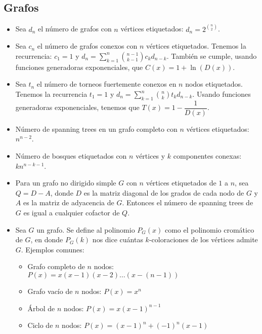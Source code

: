 \documentclass[11pt]{article}
\begin{document}
		\subsection{Grafos}
			\begin{itemize}
				\item Sea $d_n$ el número de grafos con $n$ vértices etiquetados: $\displaystyle d_n = 2^{\binom{n}{2}}$.
				\item Sea $c_n$ el número de grafos conexos con $n$ vértices etiquetados. Tenemos la recurrencia: $c_1=1$ y $\displaystyle d_n = \sum_{k=1}^{n} \binom{n-1}{k-1} c_k d_{n-k}$. También se cumple, usando funciones generadoras exponenciales, que $C(x)=1+\ln(D(x))$.
				\item Sea $t_n$ el número de torneos fuertemente conexos en $n$ nodos etiquetados. Tenemos la recurrencia $t_1=1$ y $\displaystyle d_n = \sum_{k=1}^{n} \binom{n}{k} t_k d_{n-k}$. Usando funciones generadoras exponenciales, tenemos que $T(x)=1-\dfrac{1}{D(x)}$.
				\item Número de spanning trees en un grafo completo con $n$ vértices etiquetados: $n^{n-2}$.
				\item Número de bosques etiquetados con $n$ vértices y $k$ componentes conexas: $kn^{n-k-1}$.
				\item Para un grafo no dirigido simple $G$ con $n$ vértices etiquetados de $1$ a $n$, sea $Q=D-A$, donde $D$ es la matriz diagonal de los grados de cada nodo de $G$ y $A$ es la matriz de adyacencia de $G$. Entonces el número de spanning trees de $G$ es igual a cualquier cofactor de $Q$.
				\item Sea $G$ un grafo. Se define al polinomio $P_G(x)$ como el polinomio cromático de $G$, en donde $P_G(k)$ nos dice cuántas $k$-coloraciones de los vértices admite $G$. Ejemplos comunes:
				\begin{itemize}
					\item Grafo completo de $n$ nodos: $P(x)=x(x-1)(x-2) \ldots (x-(n-1))$
					\item Grafo vacío de $n$ nodos: $P(x)=x^n$
					\item Árbol de $n$ nodos: $P(x)=x(x-1)^{n-1}$
					\item Ciclo de $n$ nodos: $P(x)=(x-1)^n + (-1)^n(x-1)$
				\end{itemize}
			\end{itemize}
		
\end{document}
